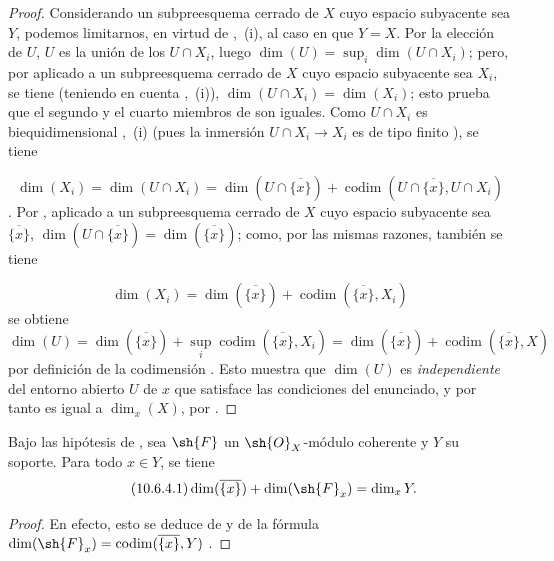 \begin{proof}
Considerando un subpreesquema cerrado de $X$ cuyo espacio subyacente sea $Y$, podemos limitarnos, en virtud de ,~(i), al caso en que $Y=X$.
Por la elección de $U$, $U$ es la unión de los $U\cap X_i$, luego $\dim(U)=\sup_i\dim(U\cap X_i)$; pero, por  aplicado a un subpreesquema cerrado de $X$ cuyo espacio subyacente sea $X_i$, se tiene (teniendo en cuenta ,~(i)), $\dim(U\cap X_i)=\dim(X_i)$; esto prueba que el segundo y el cuarto miembros de  son iguales.
Como $U\cap X_i$ es biequidimensional ,~(i) (pues la inmersión $U\cap X_i\to X_i$ es de tipo finito ), se tiene

\begin{equation}
\label{IV.10.6.3.2}
\tag{10.6.3.2}
\dim(X_i)=\dim(U\cap X_i)=\dim(U\cap\overline{\{x\}})+\operatorname{codim}(U\cap\overline{\{x\}},U\cap X_i)
\end{equation}
.
Por , aplicado a un subpreesquema cerrado de $X$ cuyo espacio subyacente sea $\overline{\{x\}}$, $\dim(U\cap\overline{\{x\}})=\dim(\overline{\{x\}})$; como, por las mismas razones, también se tiene

\begin{equation}
\label{IV.10.6.3.3}
\tag{10.6.3.3}
\dim(X_i)=\dim(\overline{\{x\}})+\operatorname{codim}(\overline{\{x\}},X_i)
\end{equation}
se obtiene
\[
  \dim(U)=\dim(\overline{\{x\}})+\sup_i\operatorname{codim}(\overline{\{x\}},X_i)=\dim(\overline{\{x\}})+\operatorname{codim}(\overline{\{x\}},X)
\]
por definición de la codimensión .
Esto muestra que $\dim(U)$ es \emph{independiente} del entorno abierto $U$ de $x$ que satisface las condiciones del enunciado, y por tanto es igual a $\dim_x(X)$, por .
\end{proof}

\begin{corollary}[10.6.4]
\label{IV.10.6.4}
Bajo las hipótesis de , sea $\sh{F}$ un $\sh{O}_X$-módulo coherente y $Y$ su soporte.
Para todo $x\in Y$, se tiene
\begin{equation}
\label{IV.10.6.4.1}
\tag{10.6.4.1}
\dim(\overline{\{x\}})+\dim(\sh{F}_x)=\dim_x Y.
\end{equation}
\end{corollary}

\begin{proof}
En efecto, esto se deduce de  y de la fórmula $\dim(\sh{F}_x)=\operatorname{codim}(\overline{\{x\}},Y)$ .
\end{proof}

